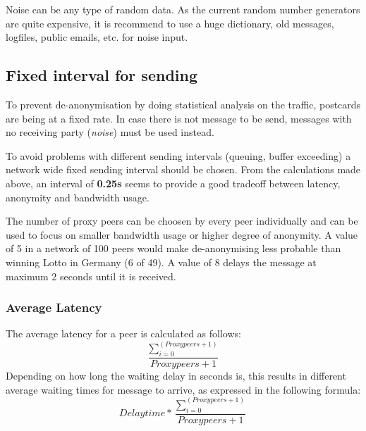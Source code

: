 Noise can be any type of random data. As the current random number generators
are quite expensive, it is recommend to use a huge dictionary, old 
messages, logfiles, public emails, etc. for noise input.

\subsection{Fixed interval for sending}
To prevent de-anonymisation by doing statistical analysis on the traffic,
postcards are being at a fixed rate.
In case there is not message to be send, messages with no receiving
party (\textit{noise}) must be used instead.

To avoid problems with different sending intervals
(queuing, buffer exceeding) a network wide fixed sending interval
should be chosen. From the calculations made above, an interval
of \textbf{0.25s} seems to provide a good tradeoff between
latency, anonymity and bandwidth usage.

The number of proxy peers can be choosen by every peer individually
and can be used to focus on smaller bandwidth usage or higher degree
of anonymity. A value of 5 in a network of 100 peers
would make de-anonymising less probable than winning Lotto in Germany
(6 of 49). A value of 8 delays the message at maximum 2 seconds until
it is received.

\subsubsection{Average Latency}
The average latency for a peer is calculated as follows:
$$\frac{\sum\limits_{i=0}^{(Proxy peers +1)}}{Proxy peers + 1}$$
Depending on how long the waiting delay in seconds is, this results
in different average waiting times for message to arrive, as expressed in
the following formula:
$$Delaytime * \frac{\sum\limits_{i=0}^{(Proxy peers +1)}}{Proxy peers + 1}$$

